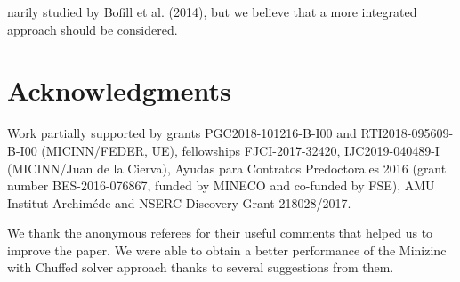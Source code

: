 \documentclass[10pt]{article}
\begin{document}
narily studied by Bofill et al. (2014), but we believe that a more integrated approach should be considered.

\section*{Acknowledgments}
Work partially supported by grants PGC2018-101216-B-I00 and RTI2018-095609-B-I00 (MICINN/FEDER, UE), fellowships FJCI-2017-32420, IJC2019-040489-I (MICINN/Juan de la Cierva), Ayudas para Contratos Predoctorales 2016 (grant number BES-2016-076867, funded by MINECO and co-funded by FSE), AMU Institut Archiméde and NSERC Discovery Grant 218028/2017.

We thank the anonymous referees for their useful comments that helped us to improve the paper. We were able to obtain a better performance of the Minizinc with Chuffed solver approach thanks to several suggestions from them.
\end{document}
